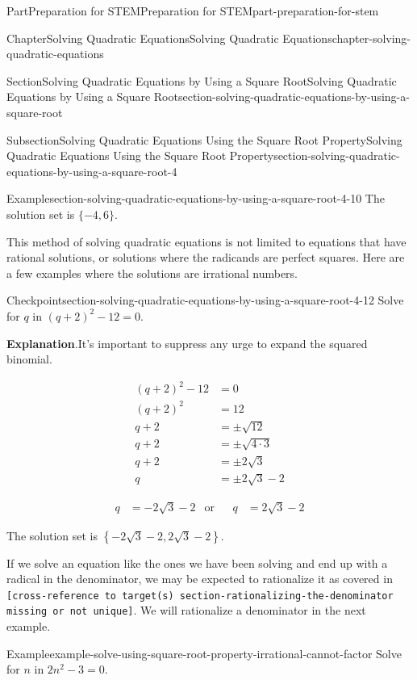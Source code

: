 \documentclass[twoside,10pt,]{book}
\newcommand{\blocktitlefont}{\relax}
\newcommand{\mono}[1]{\texttt{#1}}
\numberwithin{equation}{section}
\newcommand{\amp}{&}
\begin{document}
\begin{partptx}{Part}{Preparation for STEM}{}{Preparation for STEM}{}{}{part-preparation-for-stem}
\begin{chapterptx}{Chapter}{Solving Quadratic Equations}{}{Solving Quadratic Equations}{}{}{chapter-solving-quadratic-equations}
\begin{sectionptx}{Section}{Solving Quadratic Equations by Using a Square Root}{}{Solving Quadratic Equations by Using a Square Root}{}{}{section-solving-quadratic-equations-by-using-a-square-root}
\begin{subsectionptx}{Subsection}{Solving Quadratic Equations Using the Square Root Property}{}{Solving Quadratic Equations Using the Square Root Property}{}{}{section-solving-quadratic-equations-by-using-a-square-root-4}
\begin{example}{Example}{}{section-solving-quadratic-equations-by-using-a-square-root-4-10}
The solution set is \(\{-4,6\}\).%
\end{example}
This method of solving quadratic equations is not limited to equations that have rational solutions, or solutions where the radicands are perfect squares. Here are a few examples where the solutions are irrational numbers.%
\begin{inlineexercise}{Checkpoint}{}{section-solving-quadratic-equations-by-using-a-square-root-4-12}%
Solve for \(q\) in \((q+2)^2-12=0\text{.}\)%
\par\smallskip%
{\makeatletter{}\makeatother\noindent\textbf{\blocktitlefont Explanation}.\hypertarget{section-solving-quadratic-equations-by-using-a-square-root-4-12-3}{}\quad{}It's important to suppress any urge to expand the squared binomial.%
}\par
%
\begin{equation*}
\begin{aligned}
(q+2)^2-12\amp=0\\
(q+2)^2\amp=12\\
q+2\amp=\pm\sqrt{12}\\
q+2\amp=\pm\sqrt{4\cdot3}\\
q+2\amp=\pm2\sqrt{3}\\
q\amp=\pm2\sqrt{3}-2
\end{aligned}
\end{equation*}
%
\par
%
\begin{equation*}
\begin{aligned}
q\amp=-2\sqrt{3}-2\amp\text{or}\amp\amp q\amp=2\sqrt{3}-2
\end{aligned}
\end{equation*}
%
\par
The solution set is \(\left\{-2\sqrt{3}-2,2\sqrt{3}-2\right\}\text{.}\)%
\end{inlineexercise}%
If we solve an equation like the ones we have been solving and end up with a radical in the denominator, we may be expected to rationalize it as covered in \mono{[cross-reference to target(s) \textquotedbl{}section-rationalizing-the-denominator\textquotedbl{} missing or not unique]}. We will rationalize a denominator in the next example.%
\begin{example}{Example}{}{example-solve-using-square-root-property-irrational-cannot-factor}%
Solve for \(n\) in \(2n^2-3=0\).%
\par\smallskip%

\end{example}
\end{subsectionptx}
\end{sectionptx}
\end{chapterptx}
\end{partptx}
\end{document}
